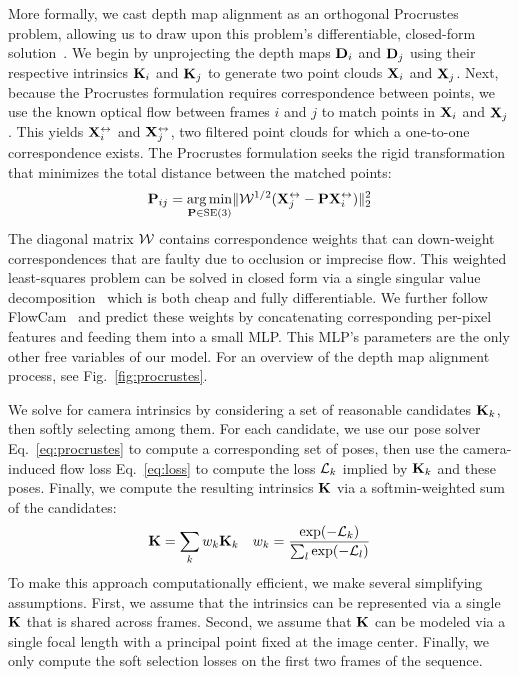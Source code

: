 More formally, we cast depth map alignment as an orthogonal Procrustes problem, allowing us to draw upon this problem's differentiable, closed-form solution~\cite{choy2020deep}.
We begin by unprojecting the depth maps $\mathbf{D}_i$ and $\mathbf{D}_j$ using their respective intrinsics $\mathbf{K}_i$ and $\mathbf{K}_j$ to generate two point clouds $\mathbf{X}_i$ and $\mathbf{X}_j$.
Next, because the Procrustes formulation requires correspondence between points, we use the known optical flow between frames $i$ and $j$ to match points in $\mathbf{X}_i$ and $\mathbf{X}_j$.
This yields $\mathbf{X}_i^\leftrightarrow$ and $\mathbf{X}_j^\leftrightarrow$, two filtered point clouds for which a one-to-one correspondence exists.
The Procrustes formulation seeks the rigid transformation that minimizes the total distance between the matched points:
\begin{align}
    \textbf{P}_{ij} = \underset{\textbf{P} \in \text{SE}(3)}{\operatorname*{arg\,min}} \| \mathcal{W}^{1/2} (\mathbf{X}_j^\leftrightarrow - \textbf{P} \mathbf{X}_i^\leftrightarrow )\|_2^2
    \label{eq:procrustes}
\end{align}
The diagonal matrix $\mathcal{W}$ contains correspondence weights that can down-weight correspondences that are faulty due to occlusion or imprecise flow.
This weighted least-squares problem can be solved in closed form via a single singular value decomposition~\cite{choy2020deep,smith2023flowcam} which is both cheap and fully differentiable.
We further follow FlowCam~\cite{smith2023flowcam} and predict these weights by concatenating corresponding per-pixel features and feeding them into a small MLP. This MLP's parameters are the only other free variables of our model.
For an overview of the depth map alignment process, see Fig.~\ref{fig:procrustes}.


We solve for camera intrinsics by considering a set of reasonable candidates $\mathbf{K}_k$, then softly selecting among them.
For each candidate, we use our pose solver Eq.~\ref{eq:procrustes} to compute a corresponding set of poses, then use the camera-induced flow loss Eq.~\ref{eq:loss} to compute the loss $\mathcal{L}_k$ implied by $\mathbf{K}_k$ and these poses.
Finally, we compute the resulting intrinsics $\mathbf{K}$ via a softmin-weighted sum of the candidates:
\begin{align}
    \mathbf{K} = \sum_k w_k \mathbf{K}_k && w_k = \frac{\exp(-\mathcal{L}_k)}{\sum_l \exp(-\mathcal{L}_l)}
\end{align}
To make this approach computationally efficient, we make several simplifying assumptions.
First, we assume that the intrinsics can be represented via a single $\mathbf{K}$ that is shared across frames.
Second, we assume that $\mathbf{K}$ can be modeled via a single focal length with a principal point fixed at the image center.
Finally, we only compute the soft selection losses on the first two frames of the sequence.

